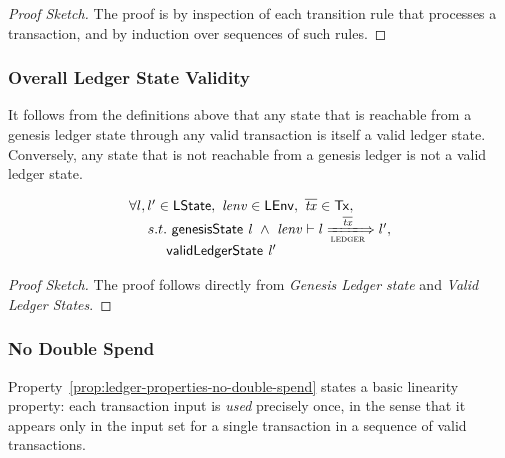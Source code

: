 \begin{proof}[Proof Sketch]
  The proof is by inspection of each transition rule that processes a transaction, and by induction over sequences of such rules.
\end{proof}


\subsubsection{Overall Ledger State Validity}

It follows from the definitions above that any state that is reachable from a
genesis ledger state through any valid transaction is itself a valid ledger state.
Conversely, any state that is not reachable from a genesis ledger  is not a valid ledger state.


\begin{definition}
  $$
  \begin{array}{l}
    \forall l,l' \in \LState, ~\var{lenv} \in \LEnv, ~\overline{\var{tx}} \in \Tx, \\
    ~~~~s.t.~\applyFun{genesisState} l ~\wedge~
    \var{lenv} \vdash l \transstar{ledger}{\overline{\var{tx}}} l',\\
    ~~~~~~~~\applyFun{validLedgerState} l'
  \end{array}
  $$
\end{definition}

\noindent
\begin{proof}[Proof Sketch]
  The proof follows directly from \emph{Genesis Ledger state} and \emph{Valid Ledger States}.
\end{proof}

\subsubsection{No Double Spend}

Property~\ref{prop:ledger-properties-no-double-spend} states a basic linearity property: each transaction input is \emph{used}
precisely once, in the sense that it appears only in the input set for a single transaction in a sequence of valid transactions. %

